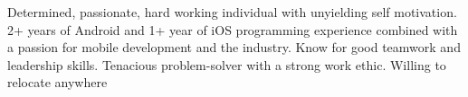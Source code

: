 

\begin{cvparagraph}

Determined, passionate, hard working individual with unyielding self motivation. 2+ years of Android and 1+ year of iOS programming experience combined with a passion for mobile development and the industry. Know for good teamwork and leadership skills. Tenacious problem-solver with a strong work ethic. Willing to relocate anywhere
\end{cvparagraph}
